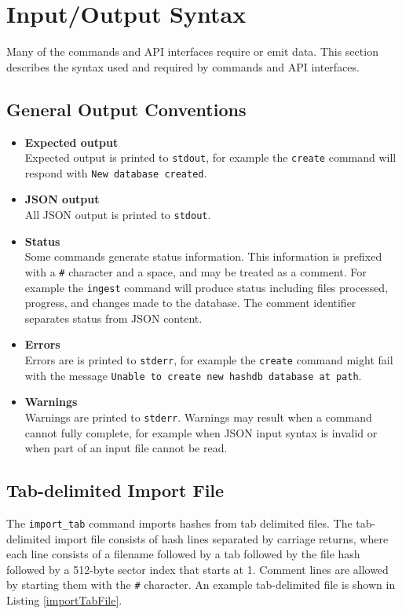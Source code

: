 \documentclass[11pt,fleqn]{article} %
\begin{document}
\section{\hdb Input/Output Syntax}
\label{InputOutputSyntax}
Many of the \hdb commands and API interfaces require or emit data.
This section describes the syntax used and required by \hdb
commands and API interfaces.

\subsection{General Output Conventions}

\begin{itemize}
\item \textbf{Expected output}\\
Expected output is printed to \verb+stdout+, for example the \hdb \verb+create+ command will respond with \verb+New database created+.
\item \textbf{JSON output}\\
All JSON output is printed to \verb+stdout+.
\item \textbf{Status}\\
Some commands generate status information. This information is prefixed with a \verb+#+ character and a space, and may be treated as a comment. For example the \hdb \verb+ingest+ command will produce status including files processed, progress, and changes made to the database. The comment identifier separates status from JSON content.
\item \textbf{Errors}\\
Errors are is printed to \verb+stderr+, for example the \hdb \verb+create+ command might fail with the message \verb+Unable to create new hashdb database at path+.
\item \textbf{Warnings}\\
Warnings are printed to \verb+stderr+. Warnings may result when a command cannot fully complete, for example when JSON input syntax is invalid or when part of an input file cannot be read.
\end{itemize}

\subsection{Tab-delimited Import File}
\label{TabFile}
The \verb+import_tab+ command imports hashes from tab delimited files.
The tab-delimited import file consists of hash lines separated by carriage returns, where each line consists of a filename followed by a tab followed by the file hash followed by a 512-byte sector index that starts at 1.  Comment lines are allowed by starting them with the \texttt{\#} character.
An example tab-delimited file is shown in Listing \ref{importTabFile}.\\
\end{document}
